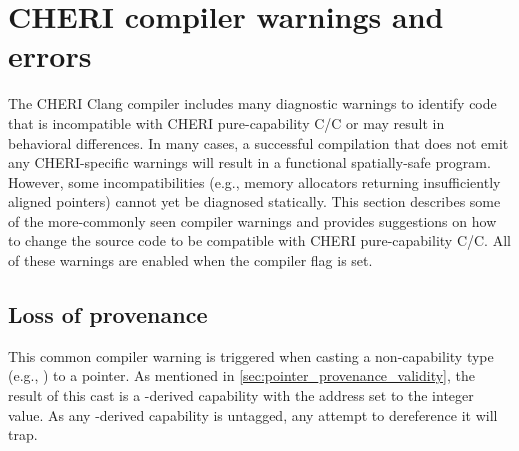 \documentclass[12pt,twoside,openright,usletter]{article}
\newcommand{\ccode}[1]{{\small\ttfamily{#1}}}
\newcommand{\commandline}[1]{{\ccode{#1}}}
\newcommand{\clongt}{{\ccode{long}}\xspace}
\newcommand{\note}[2]{{\color{blue}[ Note: #1 - #2]}}
\renewcommand{\note}[2]{\relax\ifhmode\unskip\fi}
\newcommand{\arnote}[1]{\note{#1}{Alex R.}}
\newcommand*{\cpp}[1][]{C\textsmaller[2]{\nolinebreak[4]\hspace{-.05em}\raisebox{.45ex}{\textbf{++}}}}
\newcommand*{\purecapCOrCpp}[1]{CHERI pure-capability C/\cpp{}}
\begin{document}
%
%

\section{CHERI compiler warnings and errors}

\arnote{Feed the source code into \url{https://cheri-compiler-explorer.cl.cam.ac.uk/} to get the latest warning text}

The CHERI Clang compiler includes many diagnostic warnings to identify code that is incompatible with \purecapCOrCpp{} or may result in behavioral differences.
In many cases, a successful compilation that does not emit any CHERI-specific warnings will result in a functional spatially-safe program.
However, some incompatibilities (e.g., memory allocators returning insufficiently aligned pointers) cannot yet be diagnosed statically.
This section describes some of the more-commonly seen compiler warnings and provides suggestions on how to change the source code to be compatible with \purecapCOrCpp{}.
All of these warnings are enabled when the \commandline{-Wall} compiler flag
is set.

\subsection{Loss of provenance}
This common compiler warning \arnote{that should be an error by default?} is triggered when casting a non-capability type (e.g., \clongt) to a pointer.
As mentioned in \cref{sec:pointer_provenance_validity}, the result of this cast is a \ccode{NULL}-derived capability with the address set to the integer value.
As any \ccode{NULL}-derived capability is untagged, any attempt to dereference it will trap.
\end{document}
